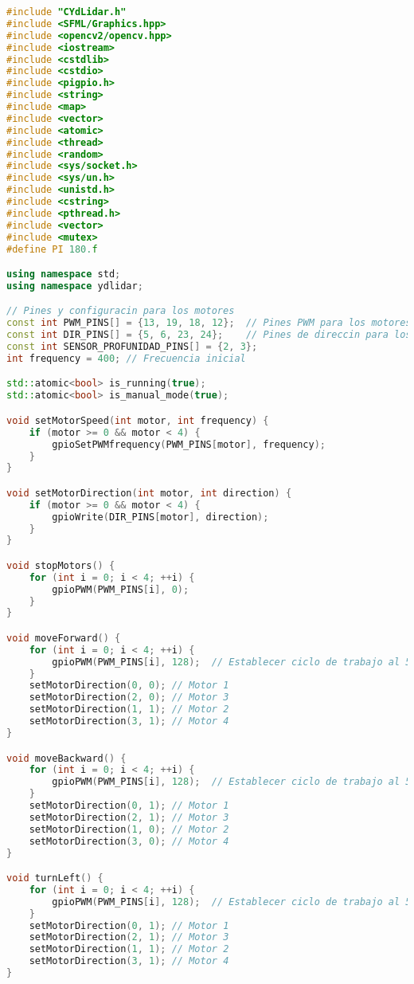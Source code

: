     \begin{lstlisting}[language={C++}, caption={Tercer ajuste de c\'odigo}, label={TercerAjuste}]
#include "CYdLidar.h"
#include <SFML/Graphics.hpp>
#include <opencv2/opencv.hpp>
#include <iostream>
#include <cstdlib>
#include <cstdio>
#include <pigpio.h>
#include <string>
#include <map>
#include <vector>
#include <atomic>
#include <thread>
#include <random>
#include <sys/socket.h>
#include <sys/un.h>
#include <unistd.h>
#include <cstring>
#include <pthread.h>
#include <vector>
#include <mutex>
#define PI 180.f

using namespace std;
using namespace ydlidar;

// Pines y configuracin para los motores
const int PWM_PINS[] = {13, 19, 18, 12};  // Pines PWM para los motores
const int DIR_PINS[] = {5, 6, 23, 24};    // Pines de direccin para los motores
const int SENSOR_PROFUNIDAD_PINS[] = {2, 3};
int frequency = 400; // Frecuencia inicial

std::atomic<bool> is_running(true);
std::atomic<bool> is_manual_mode(true);

void setMotorSpeed(int motor, int frequency) {
    if (motor >= 0 && motor < 4) {
        gpioSetPWMfrequency(PWM_PINS[motor], frequency);
    }
}

void setMotorDirection(int motor, int direction) {
    if (motor >= 0 && motor < 4) {
        gpioWrite(DIR_PINS[motor], direction);
    }
}

void stopMotors() {
    for (int i = 0; i < 4; ++i) {
        gpioPWM(PWM_PINS[i], 0);
    }
}

void moveForward() {
    for (int i = 0; i < 4; ++i) {
        gpioPWM(PWM_PINS[i], 128);  // Establecer ciclo de trabajo al 50%
    }
    setMotorDirection(0, 0); // Motor 1
    setMotorDirection(2, 0); // Motor 3
    setMotorDirection(1, 1); // Motor 2
    setMotorDirection(3, 1); // Motor 4
}

void moveBackward() {
    for (int i = 0; i < 4; ++i) {
        gpioPWM(PWM_PINS[i], 128);  // Establecer ciclo de trabajo al 50%
    }
    setMotorDirection(0, 1); // Motor 1
    setMotorDirection(2, 1); // Motor 3
    setMotorDirection(1, 0); // Motor 2
    setMotorDirection(3, 0); // Motor 4
}

void turnLeft() {
    for (int i = 0; i < 4; ++i) {
        gpioPWM(PWM_PINS[i], 128);  // Establecer ciclo de trabajo al 50%
    }
    setMotorDirection(0, 1); // Motor 1
    setMotorDirection(2, 1); // Motor 3
    setMotorDirection(1, 1); // Motor 2
    setMotorDirection(3, 1); // Motor 4
}


\end{lstlisting}
